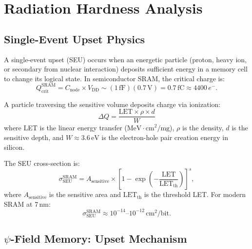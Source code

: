 \documentclass[11pt,twocolumn]{article}
\theoremstyle{definition}
\theoremstyle{remark}
\begin{document}
\section{Radiation Hardness Analysis}\label{sec:radiation}

\subsection{Single-Event Upset Physics}\label{sec:seu_physics}

A single-event upset (SEU) occurs when an energetic particle (proton,
heavy ion, or secondary from nuclear interaction) deposits sufficient
energy in a memory cell to change its logical state. In semiconductor
SRAM, the critical charge is:
\begin{equation}
Q_{\mathrm{crit}}^{\mathrm{SRAM}} = C_{\mathrm{node}} \times V_{\mathrm{DD}}
\sim (1\,\mathrm{fF})(0.7\,\mathrm{V}) = 0.7\,\mathrm{fC} \approx 4400\,e^-.
\label{eq:Qcrit_SRAM}
\end{equation}

A particle traversing the sensitive volume deposits charge via
ionization:
\begin{equation}
\Delta Q = \frac{\mathrm{LET} \times \rho \times d}{W}
\end{equation}
where LET is the linear energy transfer ($\mathrm{MeV\cdot
cm}^2/\mathrm{mg}$), $\rho$ is the density, $d$ is the sensitive depth,
and $W \approx 3.6\,\mathrm{eV}$ is the electron-hole pair creation
energy in silicon.

The SEU cross-section is:
\begin{equation}
\sigma_{\mathrm{SEU}}^{\mathrm{SRAM}} = A_{\mathrm{sensitive}} \times
\left[1 - \exp\!\left(-\frac{\mathrm{LET}}{\mathrm{LET}_{\mathrm{th}}}\right)\right]^s,
\end{equation}
where $A_{\mathrm{sensitive}}$ is the sensitive area and
$\mathrm{LET}_{\mathrm{th}}$ is the threshold LET. For modern SRAM at
7\,nm:
\begin{equation}
\sigma_{\mathrm{SEU}}^{\mathrm{SRAM}} \approx 10^{-14}\text{--}10^{-12}\,\mathrm{cm}^2/\mathrm{bit}.
\end{equation}

\subsection{$\psi$-Field Memory: Upset Mechanism}\label{sec:psi_seu}
\end{document}
